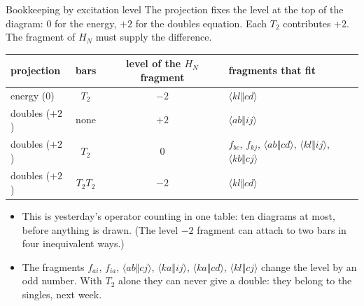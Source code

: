 \documentclass[aspectratio=169,10pt]{beamer}
\newcommand{\as}[4]{\langle #1#2\Vert #3#4\rangle}
\begin{document}
\begin{frame}[shrink=3]{Bookkeeping by excitation level}
The projection fixes the level at the top of the diagram: $0$ for the energy, $+2$ for the doubles equation. Each $T_2$ contributes $+2$. The fragment of $H_N$ must supply the difference.
\begin{center}
\renewcommand{\arraystretch}{1.3}
\begin{tabular}{lccl}
\toprule
projection & bars & level of the $H_N$ fragment & fragments that fit\\
\midrule
energy ($0$) & $T_2$ & $-2$ & $\as klcd$\\
\midrule
doubles ($+2$) & none & $+2$ & $\as abij$\\
doubles ($+2$) & $T_2$ & $0$ & $f_{bc}$, $f_{kj}$, $\as abcd$, $\as klij$, $\as kbcj$\\
doubles ($+2$) & $T_2T_2$ & $-2$ & $\as klcd$\\
\bottomrule
\end{tabular}
\end{center}
\begin{itemize}
\item This is yesterday's operator counting in one table: ten diagrams at most, before anything is drawn. (The level $-2$ fragment can attach to two bars in four inequivalent ways.)
\item The fragments $f_{ai}$, $f_{ia}$, $\as abcj$, $\as kaij$, $\as kacd$, $\as klcj$ change the level by an odd number. With $T_2$ alone they can never give a double: they belong to the singles, next week.
\end{itemize}
\end{frame}
\end{document}
